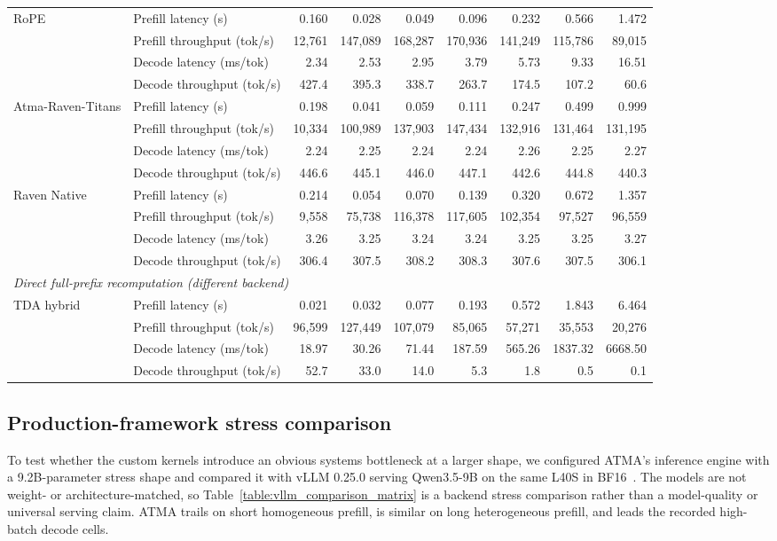 \begin{landscape}
\begin{longtable}{llrrrrrrr}
\midrule
RoPE & Prefill latency (s) & 0.160 & 0.028 & 0.049 & 0.096 & 0.232 & 0.566 & 1.472 \\
& Prefill throughput (tok/s) & 12,761 & 147,089 & 168,287 & 170,936 & 141,249 & 115,786 & 89,015 \\
& Decode latency (ms/tok) & 2.34 & 2.53 & 2.95 & 3.79 & 5.73 & 9.33 & 16.51 \\
& Decode throughput (tok/s) & 427.4 & 395.3 & 338.7 & 263.7 & 174.5 & 107.2 & 60.6 \\
\midrule
Atma-Raven-Titans & Prefill latency (s) & 0.198 & 0.041 & 0.059 & 0.111 & 0.247 & 0.499 & 0.999 \\
& Prefill throughput (tok/s) & 10,334 & 100,989 & 137,903 & 147,434 & 132,916 & 131,464 & 131,195 \\
& Decode latency (ms/tok) & 2.24 & 2.25 & 2.24 & 2.24 & 2.26 & 2.25 & 2.27 \\
& Decode throughput (tok/s) & 446.6 & 445.1 & 446.0 & 447.1 & 442.6 & 444.8 & 440.3 \\
\midrule
Raven Native & Prefill latency (s) & 0.214 & 0.054 & 0.070 & 0.139 & 0.320 & 0.672 & 1.357 \\
& Prefill throughput (tok/s) & 9,558 & 75,738 & 116,378 & 117,605 & 102,354 & 97,527 & 96,559 \\
& Decode latency (ms/tok) & 3.26 & 3.25 & 3.24 & 3.24 & 3.25 & 3.25 & 3.27 \\
& Decode throughput (tok/s) & 306.4 & 307.5 & 308.2 & 308.3 & 307.6 & 307.5 & 306.1 \\
\midrule
\multicolumn{9}{l}{\textit{Direct full-prefix recomputation (different backend)}} \\
TDA hybrid & Prefill latency (s) & 0.021 & 0.032 & 0.077 & 0.193 & 0.572 & 1.843 & 6.464 \\
& Prefill throughput (tok/s) & 96,599 & 127,449 & 107,079 & 85,065 & 57,271 & 35,553 & 20,276 \\
& Decode latency (ms/tok) & 18.97 & 30.26 & 71.44 & 187.59 & 565.26 & 1837.32 & 6668.50 \\
& Decode throughput (tok/s) & 52.7 & 33.0 & 14.0 & 5.3 & 1.8 & 0.5 & 0.1 \\
\end{longtable}
\endgroup
\end{landscape}

\subsection{Production-framework stress comparison}
To test whether the custom kernels introduce an obvious systems bottleneck at a larger shape, we configured ATMA's inference engine with a 9.2B-parameter stress shape and compared it with vLLM 0.25.0 serving Qwen3.5-9B on the same L40S in BF16~\citep{kwon2023vllm}. The models are not weight- or architecture-matched, so Table~\ref{table:vllm_comparison_matrix} is a backend stress comparison rather than a model-quality or universal serving claim. ATMA trails on short homogeneous prefill, is similar on long heterogeneous prefill, and leads the recorded high-batch decode cells.

